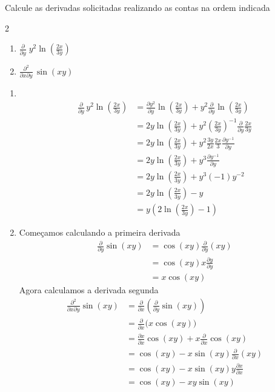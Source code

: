 \documentclass[a4paper,12pt,fleqn]{article}
\newcommand{\D}[2]{\frac{\partial {#1}}{\partial {#2}}}
\newcommand{\DM}[3]{\frac{\partial^2 {#1}}{\partial {#2} \partial {#3}}}
\begin{document}
Calcule as derivadas solicitadas realizando as contas na ordem indicada
\begin{multicols}{2}
\begin{enumerate}
  \item[{a)}] \(\D{}{y}\;     y^2\ln\left(\frac{2x}{3y}\right)\)
  \item[{b)}] \(\DM{}{x}{y}\, \sin(xy)\)
\end{enumerate}
\end{multicols}

\begin{answer}
\begin{enumerate}
  \item[{a)}] ~\vspace{-2\baselineskip}
  \begin{align*}
    \D{}{y}\, y^2\ln\left(\frac{2x}{3y}\right)
    & = \D{y^2}{y}\ln\left(\frac{2x}{3y}\right)
      + y^2 \D{}{y}\ln\left(\frac{2x}{3y}\right) \\[2mm]
    & = 2y\ln\left(\frac{2x}{3y}\right)
      + y^2 \left(\frac{2x}{3y}\right)^{-1}\D{}{y}\frac{2x}{3y} \\[2mm]
    & = 2y\ln\left(\frac{2x}{3y}\right)
      + y^2 \frac{3y}{2x}\frac{2x}{3}\D{y^{-1}}{y} \\[2mm]
    & = 2y\ln\left(\frac{2x}{3y}\right)
      + y^3\D{y^{-1}}{y} \\[2mm]
    & = 2y\ln\left(\frac{2x}{3y}\right) + y^3(-1)y^{-2} \\[2mm]
    & = 2y\ln\left(\frac{2x}{3y}\right) - y \\[2mm]
    & = y \left(2\ln\left(\frac{2x}{3y}\right) - 1 \right)
  \end{align*}

  \item[{b)}] Começamos calculando a primeira derivada
  \begin{align*}
    \D{}{y}\sin(xy)
    & = \cos(xy)\D{}{y}(xy) \\[2mm]
    & = \cos(xy)x\D{y}{y} \\[2mm]
    & = x\cos(xy)
  \end{align*}
  Agora calculamos a derivada segunda
  \begin{align*}
    \DM{}{x}{y} \sin(xy)
    & = \D{}{x} \left(\D{}{y}\sin(xy)\right) \\[2mm]
    & = \D{}{x} \big(x\cos(xy)\big) \\[2mm]
    & = \D{x}{x} \cos(xy) + x \D{}{x} \cos(xy) \\[2mm]
    & = \cos(xy) - x \sin(xy)\D{}{x}(xy) \\[2mm]
    & = \cos(xy) - x \sin(xy)y\D{x}{x} \\[2mm]
    & = \cos(xy) - xy \sin(xy)
  \end{align*}
\end{enumerate}
\end{answer}

\end{document}
